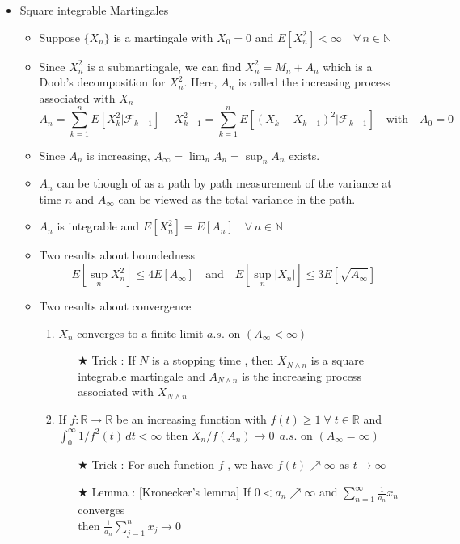 \documentclass[12pt, A4]{article}
\newcommand{\trick}{$\bigstar$}
\newcommand{\N}{\mathbb{N}}
\newcommand{\R}{\mathbb{R}}
\newcommand{\F}{\mathcal{F}}
\newcommand{\foranyn}{\quad \forall \, n\in \N}
\begin{document}
\begin{itemize}
\begin{itemize}
\begin{enumerate}
\begin{itemize}
			\end{itemize}
		\end{enumerate}
	\end{itemize} 
	\item Square integrable Martingales
	\begin{itemize}
		\item Suppose $\{X_n\}$ is a martingale with $X_0=0$ and $E[X_n^2]<\infty\foranyn$
		\item Since $X_n^2$ is a submartingale, we can find $X_n^2=M_n+A_n$ which is a Doob's decomposition for $X_n^2$. Here, $A_n$ is called the increasing process associated with $X_n$
		$$A_n=\sum_{k=1}^n E[X_k^2|\F_{k-1}]-X_{k-1}^2=\sum_{k=1}^n E[(X_k-X_{k-1})^2|\F_{k-1}]\quad \text{with}\quad A_0=0$$
		\item Since $A_n$ is increasing, $A_\infty=\lim_n A_n=\sup_n A_n$ exists. 
		\item $A_n$ can be though of as a path by path measurement of the variance at time $n$ and $A_\infty$ can be viewed as the total variance in the path.
		\item $A_n$ is integrable and $E[X_n^2]=E[A_n]\foranyn$
		\item Two results about boundedness 
		$$E[\sup_n X_n^2]\leq 4E[A_\infty]\quad \text{and} \quad E[\sup_n|X_n|]\leq 3E[\sqrt{A_\infty}]$$
		\item Two results about convergence
		\begin{enumerate}
			\item $X_n$ converges to a finite limit $a.s.$ on $(A_\infty<\infty)$
			\begin{itemize}
				\item[\trick] Trick : If $N$ is a stopping time , then $X_{N\wedge n}$ is a square integrable martingale and $A_{N\wedge n}$ is the increasing process associated with $X_{N\wedge n}$
			\end{itemize}
			\item If $f:\R\rightarrow \R$ be an increasing function with $f(t)\geq 1\; \forall\;t\in \R$\; and\; $\int_0^\infty 1/f^2(t)\,dt<\infty$ then $X_n/f(A_n)\rightarrow 0\;\,a.s.$ on $(A_\infty=\infty)$
			\begin{itemize}
				\item[\trick] Trick : For such function $f$ , we have $f(t)\nearrow \infty$ as $t\rightarrow \infty$
				\item[\trick] Lemma : {[Kronecker's lemma]} If $0<a_n\nearrow\infty$ and $\sum_{n=1}^{\infty} \frac{1}{a_n}x_n$ converges \\ then $\frac{1}{a_n}\sum_{j=1}^nx_j \rightarrow 0 $ 

\end{itemize}
\end{enumerate}
\end{itemize}
\end{itemize}
\end{document}
